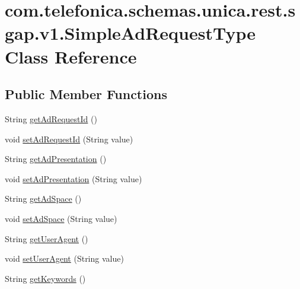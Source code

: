 \hypertarget{classcom_1_1telefonica_1_1schemas_1_1unica_1_1rest_1_1sgap_1_1v1_1_1SimpleAdRequestType}{
\section{com.telefonica.schemas.unica.rest.sgap.v1.SimpleAdRequestType Class Reference}
\label{classcom_1_1telefonica_1_1schemas_1_1unica_1_1rest_1_1sgap_1_1v1_1_1SimpleAdRequestType}
}
\subsection*{Public Member Functions}
\begin{DoxyCompactItemize}
\item 
String \hyperlink{classcom_1_1telefonica_1_1schemas_1_1unica_1_1rest_1_1sgap_1_1v1_1_1SimpleAdRequestType_a6b953ee2c0183dab6d93ff2053cca22c}{getAdRequestId} ()
\item 
void \hyperlink{classcom_1_1telefonica_1_1schemas_1_1unica_1_1rest_1_1sgap_1_1v1_1_1SimpleAdRequestType_a05f65445ed147e84b049679352d40bd8}{setAdRequestId} (String value)
\item 
String \hyperlink{classcom_1_1telefonica_1_1schemas_1_1unica_1_1rest_1_1sgap_1_1v1_1_1SimpleAdRequestType_acbd9818dbf06af6dd19f186236203c58}{getAdPresentation} ()
\item 
void \hyperlink{classcom_1_1telefonica_1_1schemas_1_1unica_1_1rest_1_1sgap_1_1v1_1_1SimpleAdRequestType_a76ae644685ea75f58862ad34cf51502b}{setAdPresentation} (String value)
\item 
String \hyperlink{classcom_1_1telefonica_1_1schemas_1_1unica_1_1rest_1_1sgap_1_1v1_1_1SimpleAdRequestType_af9dcb651620cdf335baadced2bf94bd0}{getAdSpace} ()
\item 
void \hyperlink{classcom_1_1telefonica_1_1schemas_1_1unica_1_1rest_1_1sgap_1_1v1_1_1SimpleAdRequestType_ae1d70f3c69a2ea167921aa246e0d6214}{setAdSpace} (String value)
\item 
String \hyperlink{classcom_1_1telefonica_1_1schemas_1_1unica_1_1rest_1_1sgap_1_1v1_1_1SimpleAdRequestType_a20cb56d96a9502d60bdea86853212435}{getUserAgent} ()
\item 
void \hyperlink{classcom_1_1telefonica_1_1schemas_1_1unica_1_1rest_1_1sgap_1_1v1_1_1SimpleAdRequestType_a9c2962c0995c8398456acefede9ef029}{setUserAgent} (String value)
\item 
String \hyperlink{classcom_1_1telefonica_1_1schemas_1_1unica_1_1rest_1_1sgap_1_1v1_1_1SimpleAdRequestType_a202742836fdb76fa71b041c9b74fb755}{getKeywords} ()

\end{DoxyCompactItemize}

